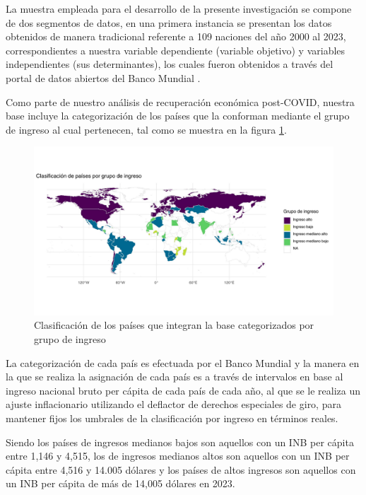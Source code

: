 \documentclass[conference]{IEEEtran}
\begin{document}
La muestra empleada para el desarrollo de la presente investigación se compone de dos segmentos de datos, en una primera instancia se presentan los datos obtenidos de manera tradicional referente a 109 naciones del año 2000 al 2023, correspondientes a nuestra variable dependiente (variable objetivo) y variables independientes (sus determinantes), los cuales fueron obtenidos a través del portal de datos abiertos del Banco Mundial \cite{worldbank}.

Como parte de nuestro análisis de recuperación económica post-COVID, nuestra base incluye la categorización de los países que la conforman mediante el grupo de ingreso al cual pertenecen, tal como se muestra en la figura \ref{fig:mapa}. 

\begin{figure}[H]
    \centering
    \includegraphics[width=1.1\linewidth]{Paisesingreso.pdf}
    \caption{Clasificación de los países que integran la base categorizados por grupo de ingreso}
    \label{fig:mapa}
\end{figure}

La categorización de cada país es efectuada por el Banco Mundial y la manera en la que se realiza la asignación de cada país es a través de intervalos en base al ingreso nacional bruto per cápita de cada país de cada año, al que se le realiza un ajuste inflacionario utilizando el deflactor de  derechos especiales de giro, para mantener fijos los umbrales de la clasificación por ingreso en términos reales.

Siendo los países de ingresos medianos bajos son aquellos con un INB per cápita entre 1,146 y 4,515, los de ingresos medianos altos son aquellos con un INB per cápita entre 4,516 y 14.005 dólares y los países de altos ingresos son aquellos con un INB per cápita de más de 14,005 dólares en 2023.
\end{document}
